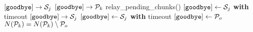 \documentclass{article}
\begin{document}
\pagestyle{empty}

\newcommand{\send}{\Rightarrow}
\newcommand{\sendto}{\rightarrow}
\algrenewcommand{}

\begin{algorithmic}

  \State $[\mathtt{goodbye}] \sendto {\cal S}_j$
  $[\mathtt{goodbye}] \sendto {\cal P}_k$
  \EndFor
  \State relay\_pending\_chunks()
  \State $[\mathtt{goodbye}] \gets {\cal S}_j$ \textbf{with} timeout
  \State $[\mathtt{goodbye}] \sendto {\cal S}_j$
  \State $[\mathtt{goodbye}] \gets {\cal S}_j$ \textbf{with} timeout
  \EndWhile
  \EndProcedure
  \newline
  \State $[\mathtt{goodbye}] \gets {\cal P}_o$
  \State $N({\cal P}_k)=N({\cal P}_k) \setminus {\cal P}_o$
  \EndWhile
  \EndProcedure
  
\end{algorithmic}
\end{document}
